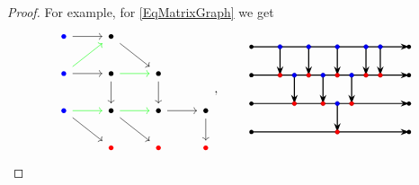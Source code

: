 \documentclass[11pt, reqno]{amsart}
\theoremstyle{definition}
\numberwithin{equation}{section}
\begin{document}
\begin{proof}
For example, for \eqref{EqMatrixGraph} we get 
\begin{equation}
\begin{tikzcd}
	\color{blue}{\bullet} & \bullet \\
	\color{blue}{\bullet}& \bullet & \bullet \\
	\color{blue}{\bullet} & \bullet & \bullet & \bullet \\
	& \color{red}{\bullet} & \color{red}{\bullet} & \color{red}{\bullet}
	\arrow[from=1-1, to=1-2]
	\arrow[from=1-2, to=2-3]
	\arrow[color=green, from=2-1, to=1-2]
	\arrow[from=2-1, to=2-2]
	\arrow[color=green, from=2-2, to=2-3]
	\arrow[from=2-2, to=3-2]
	\arrow[from=2-3, to=3-3]
	\arrow[color=green, from=3-1, to=3-2]
	\arrow[from=3-1, to=4-2]
	\arrow[color=green, from=3-2, to=3-3]
	\arrow[from=3-2, to=4-3]
	\arrow[from=3-3, to=3-4]
	\arrow[from=3-4, to=4-4]
\end{tikzcd}, \qquad 
\vcenter{ \hbox{ \begin{tikzpicture}[>=Stealth, line cap=round, x=4mm, y=8mm]
  \tikzset{
    wire/.style   ={line width=0.8pt},
    post/.style   ={line width=0.9pt,->},
    reddot/.style ={circle,draw=red!70!black,fill=red,inner sep=1.2pt},
    bluedot/.style={circle,draw=blue!70!black,fill=blue,inner sep=1.2pt},
    blackdot/.style={circle,fill=black,inner sep=1.2pt},    
    elab/.style   ={font=\small}
  }
  \draw[wire,->] ( -1,0) -- (10,0);
  \draw[wire,->] (  -1,1) -- ( 10,1);
  \draw[wire,->] (  -1,2) -- ( 10,2);
  \draw[wire,->] (  -1,3) -- ( 10,3);

  \foreach \x in {5}{
    \draw[post] (\x,1) -- (\x,0);
    \node[reddot] at (\x,0) {};
    \node[bluedot]  at (\x,1) {};
  }
  \foreach \x in {2,4,6}{
    \draw[post] (\x,2) -- (\x,1);
    \node[reddot] at (\x,1) {};
    \node[bluedot]  at (\x,2) {};
  }
  \foreach \x in {1,3,5,7,8}{
    \draw[post] (\x,3) -- (\x,2);
    \node[reddot] at (\x,2) {};
    \node[bluedot]  at (\x,3) {};
  }




   \node[blackdot] at (-1,0) {};
   \node[blackdot] at (-1,1) {};
   \node[blackdot] at (-1,2) {};
   \node[blackdot] at (-1,3) {};
   \node[blackdot] at (10,0) {};
   \node[blackdot] at (10,1) {};
   \node[blackdot] at (10,2) {};
   \node[blackdot] at (10,3) {};







\end{tikzpicture}}}
\end{equation}
\end{proof}
\end{document}
